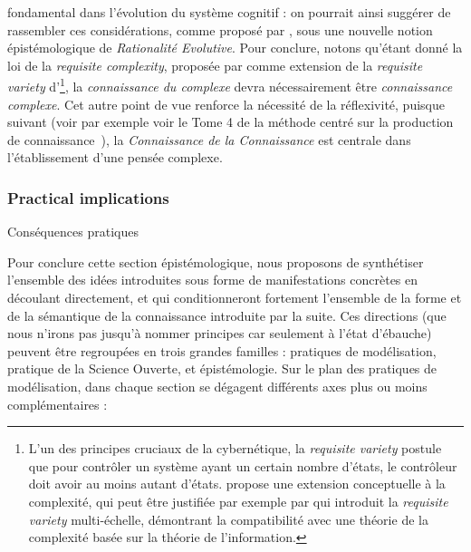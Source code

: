fondamental dans l'évolution du système cognitif : on pourrait ainsi suggérer de rassembler ces considérations, comme proposé par , sous une nouvelle notion épistémologique de \emph{Rationalité Evolutive}. Pour conclure, notons qu'étant donné la loi de la \emph{requisite complexity}, proposée par \cite{gershenson2015requisite} comme extension de la \emph{requisite variety} d'\footnote{L'un des principes cruciaux de la cybernétique, la \emph{requisite variety} postule que pour contrôler un système ayant un certain nombre d'états, le contrôleur doit avoir au moins autant d'états.  propose une extension conceptuelle à la complexité, qui peut être justifiée par exemple par \cite{allen2017multiscale} qui introduit la \emph{requisite variety} multi-échelle, démontrant la compatibilité avec une théorie de la complexité basée sur la théorie de l'information.}, la \emph{connaissance du complexe} devra nécessairement être \emph{connaissance complexe}. Cet autre point de vue renforce la nécessité de la réflexivité, puisque suivant  (voir par exemple voir le Tome 4 de la méthode centré sur la production de connaissance~\cite{morin1991methode}), la \emph{Connaissance de la Connaissance} est centrale dans l'établissement d'une pensée complexe.








\subsubsection*{Practical implications}{Conséquences pratiques}


Pour conclure cette section épistémologique, nous proposons de synthétiser l'ensemble des idées introduites sous forme de manifestations concrètes en découlant directement, et qui conditionneront fortement l'ensemble de la forme et de la sémantique de la connaissance introduite par la suite. Ces directions (que nous n'irons pas jusqu'à nommer principes car seulement à l'état d'ébauche) peuvent être regroupées en trois grandes familles : pratiques de modélisation, pratique de la Science Ouverte, et épistémologie. Sur le plan des pratiques de modélisation, dans chaque section se dégagent différents axes plus ou moins complémentaires :

